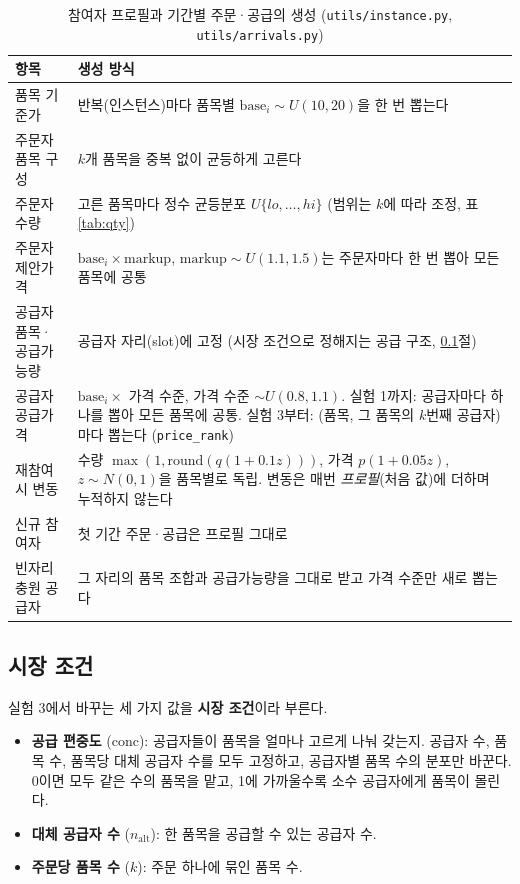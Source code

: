 \documentclass[11pt,a4paper]{article}
\begin{document}
\begin{table}[H]
\centering\small
\caption{참여자 프로필과 기간별 주문·공급의 생성 (\texttt{utils/instance.py}, \texttt{utils/arrivals.py})}
\begin{tabularx}{\linewidth}{lY}
\toprule
항목 & 생성 방식\\
\midrule
품목 기준가 & 반복(인스턴스)마다 품목별 $\mathrm{base}_i\sim U(10,20)$을 한 번 뽑는다\\
주문자 품목 구성 & $k$개 품목을 중복 없이 균등하게 고른다\\
주문자 수량 & 고른 품목마다 정수 균등분포 $U\{lo,\dots,hi\}$ (범위는 $k$에 따라 조정, 표 \ref{tab:qty})\\
주문자 제안가격 & $\mathrm{base}_i\times \mathrm{markup}$, $\mathrm{markup}\sim U(1.1,1.5)$는 주문자마다 한 번 뽑아 모든 품목에 공통\\
공급자 품목·공급가능량 & 공급자 자리(slot)에 고정 (시장 조건으로 정해지는 공급 구조, \ref{sec:market}절)\\
공급자 공급가격 & $\mathrm{base}_i\times$ 가격 수준, 가격 수준 $\sim U(0.8,1.1)$.
실험 1까지: 공급자마다 하나를 뽑아 모든 품목에 공통.
실험 3부터: (품목, 그 품목의 $k$번째 공급자)마다 뽑는다 (\texttt{price\_rank})\\
재참여 시 변동 & 수량 $\max(1,\mathrm{round}(q(1+0.1z)))$, 가격 $p(1+0.05z)$, $z\sim N(0,1)$을 품목별로 독립.
변동은 매번 \emph{프로필}(처음 값)에 더하며 누적하지 않는다\\
신규 참여자 & 첫 기간 주문·공급은 프로필 그대로\\
빈자리 충원 공급자 & 그 자리의 품목 조합과 공급가능량을 그대로 받고 가격 수준만 새로 뽑는다\\
\bottomrule
\end{tabularx}
\end{table}

\subsection{시장 조건}\label{sec:market}

실험 3에서 바꾸는 세 가지 값을 \textbf{시장 조건}이라 부른다.

\begin{itemize}[leftmargin=1.5em]
  \item \textbf{공급 편중도} ($\mathrm{conc}$): 공급자들이 품목을 얼마나 고르게 나눠 갖는지.
        공급자 수, 품목 수, 품목당 대체 공급자 수를 모두 고정하고, 공급자별 품목 수의 분포만 바꾼다.
        0이면 모두 같은 수의 품목을 맡고, 1에 가까울수록 소수 공급자에게 품목이 몰린다.
  \item \textbf{대체 공급자 수} ($n_{\mathrm{alt}}$): 한 품목을 공급할 수 있는 공급자 수.
  \item \textbf{주문당 품목 수} ($k$): 주문 하나에 묶인 품목 수.
\end{itemize}
\end{document}

